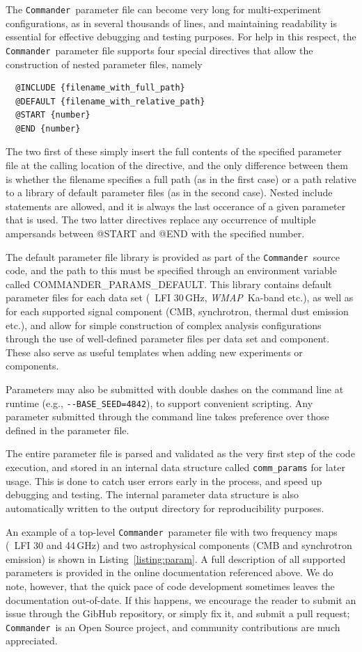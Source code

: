 \documentclass[twocolumn]{aa}
\def\WMAP{\emph{WMAP}}
\def\commander{\texttt{Commander}}
\begin{document}
The \commander\ parameter file can become very long for
multi-experiment configurations, as in several thousands of lines, and
maintaining readability is essential for effective debugging and
testing purposes. For help in this respect, the \commander\ parameter
file supports four special directives that allow the construction of
nested parameter files, namely
\begin{verbatim}
  @INCLUDE {filename_with_full_path}
  @DEFAULT {filename_with_relative_path}
  @START {number}
  @END {number}
\end{verbatim}
The two first of these simply insert the full contents of the
specified parameter file at the calling location of the directive, and
the only difference between them is whether the filename specifies a
full path (as in the first case) or a path relative to a library of
default parameter files (as in the second case). Nested include
statements are allowed, and it is always the last occerance of a given
parameter that is used. The two latter directives replace any
occurrence of multiple ampersands between @START and @END with the
specified number.

The default parameter file library is provided as part of the
\commander\ source code, and the path to this must be specified
through an environment variable called
COMMANDER\_PARAMS\_DEFAULT. This library contains default parameter
files for each data set (\Planck\ LFI 30\,GHz, \WMAP\ Ka-band etc.),
as well as for each supported signal component (CMB, synchrotron,
thermal dust emission etc.), and allow for simple construction of
complex analysis configurations through the use of well-defined
parameter files per data set and component. These also serve as useful
templates when adding new experiments or components.

Parameters may also be submitted with double dashes on the command
line at runtime (e.g., \texttt{-{}-BASE\_SEED=4842}), to support
convenient scripting. Any parameter submitted through the command line
takes preference over those defined in the parameter file.

The entire parameter file is parsed and validated as the very first
step of the code execution, and stored in an internal data structure
called \texttt{comm\_params} for later usage. This is done to catch
user errors early in the process, and speed up debugging and
testing. The internal parameter data structure is also automatically
written to the output directory for reproducibility purposes.

An example of a top-level \commander\ parameter file with two
frequency maps (\Planck\ LFI 30 and 44\,GHz) and two astrophysical
components (CMB and synchrotron emission) is shown in
Listing~\ref{listing:param}. A full description of all supported
parameters is provided in the online documentation referenced
above. We do note, however, that the quick pace of code development
sometimes leaves the documentation out-of-date. If this happens, we
encourage the reader to submit an issue through the GibHub repository,
or simply fix it, and submit a pull request; \commander\ is an Open Source project,
and community contributions are much appreciated.
\end{document}
